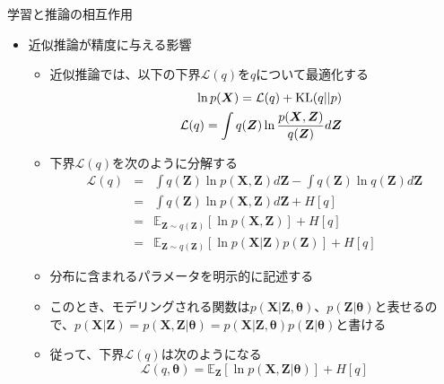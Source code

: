 \documentclass[dvipdfmx,notheorems,t]{beamer}
\begin{document}
\begin{frame}{学習と推論の相互作用}

\begin{itemize}
	\item 近似推論が精度に与える影響
	\begin{itemize}
		\item 近似推論では、以下の下界$\mathcal{L}(q)$を$q$について最適化する
		\begin{eqnarray}
			&& \ln p(\bm{X}) = \mathcal{L}(q) + \operatorname{KL}(q || p) \\
			&& \mathcal{L}(q) = \int q(\bm{Z}) \ln \frac{p(\bm{X}, \bm{Z})}{q(\bm{Z})} d\bm{Z}
		\end{eqnarray}
		
		\item 下界$\mathcal{L}(q)$を次のように分解する
		\begin{eqnarray}
			\mathcal{L}(q) &=& \int q(\bm{Z}) \ln p(\bm{X}, \bm{Z}) d\bm{Z} - \int q(\bm{Z}) \ln q(\bm{Z}) d\bm{Z} \\
			&=& \int q(\bm{Z}) \ln p(\bm{X}, \bm{Z}) d\bm{Z} + H[q] \\
			&=& \mathbb{E}_{\bm{Z} \sim q(\bm{Z})} \left[ \ln p(\bm{X}, \bm{Z}) \right] + H[q] \\
			&=& \mathbb{E}_{\bm{Z} \sim q(\bm{Z})} \left[ \ln p(\bm{X} | \bm{Z}) p(\bm{Z}) \right] + H[q]
		\end{eqnarray}
		
		\item 分布に含まれるパラメータを明示的に記述する
		\item このとき、モデリングされる関数は$p(\bm{X} | \bm{Z}, \bm{\theta})$、$p(\bm{Z} | \bm{\theta})$と表せるので、$p(\bm{X} | \bm{Z}) = p(\bm{X}, \bm{Z} | \bm{\theta}) = p(\bm{X} | \bm{Z}, \bm{\theta}) p(\bm{Z} | \bm{\theta})$と書ける
		\item 従って、下界$\mathcal{L}(q)$は次のようになる
		\begin{equation}
			\mathcal{L}(q, \bm{\theta}) = \mathbb{E}_{\bm{Z}} \left[ \ln p(\bm{X}, \bm{Z} | \bm{\theta}) \right] + H[q]
		\end{equation}
		

\end{itemize}
\end{itemize}
\end{frame}
\end{document}
